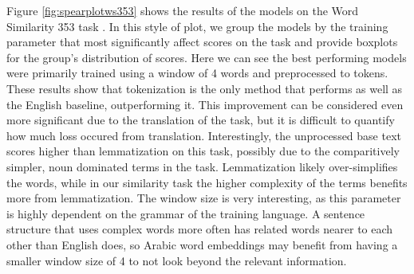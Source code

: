 Figure \ref{fig:spearplotws353} shows the results of the models on the Word Similarity 353 task \cite{finkelstein:2001,hassan:2009}. In this style of plot, we group the models by the training parameter that most significantly affect scores on the task and provide boxplots for the group's distribution of scores. Here we can see the best performing models were primarily trained using a window of 4 words and preprocessed to tokens. These results show that tokenization is the only method that performs as well as the English baseline, outperforming it. This improvement can be considered even more significant due to the translation of the task, but it is difficult to quantify how much loss occured from translation. Interestingly, the unprocessed base text scores higher than lemmatization on this task, possibly due to the comparitively simpler, noun dominated terms in the task. Lemmatization likely over-simplifies the words, while in our similarity task the higher complexity of the terms benefits more from lemmatization. The window size is very interesting, as this parameter is highly dependent on the grammar of the training language. A sentence structure that uses complex words more often has related words nearer to each other than English does, so Arabic word embeddings may benefit from having a smaller window size of 4 to not look beyond the relevant information.



